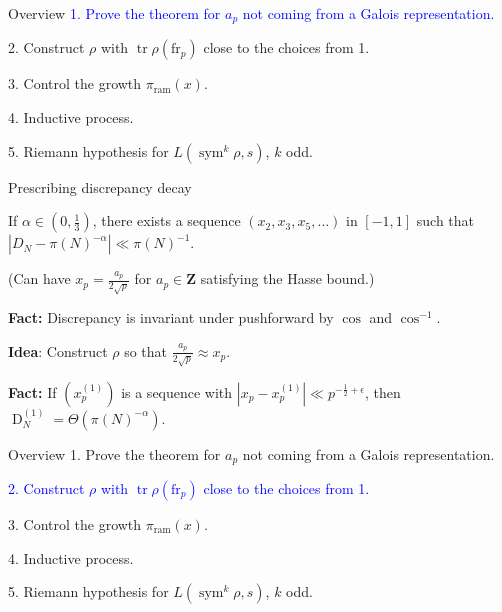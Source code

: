 \documentclass{beamer}
\DeclareMathOperator{\D}{D}
\DeclareMathOperator{\ram}{ram}
\DeclareMathOperator{\sym}{sym}
\DeclareMathOperator{\tr}{tr}
\newcommand{\bZ}{\mathbf{Z}}
\newcommand{\frob}{\mathrm{fr}}
\begin{document}
\begin{frame}{Overview}
\textcolor{blue}{
1. Prove the theorem for $a_p$ not coming from a Galois representation.}

\color{shade}
2. Construct $\rho$ with $\tr\rho(\frob_p)$ close to the choices from 1. 

3. Control the growth $\pi_{\ram}(x)$. 

4. Inductive process.

5. Riemann hypothesis for $L(\sym^k\rho,s)$, $k$ odd.
\end{frame}



\begin{frame}{Prescribing discrepancy decay}
\begin{theorem}[M.]
If $\alpha\in \left(0,\frac 1 3\right)$, there exists a sequence 
$(x_2,x_3,x_5,\dots)$ in $[-1,1]$ such that 
$| D_N - \pi(N)^{-\alpha}| \ll \pi(N)^{-1}$. 
\end{theorem}
\pause

(Can have $x_p = \frac{a_p}{2\sqrt p}$ for $a_p\in \bZ$ satisfying the 
Hasse bound.) 
\pause

\textbf{Fact:} 
Discrepancy is invariant under pushforward by $\cos$ and $\cos^{-1}$. 
\pause

\textbf{Idea}:
Construct $\rho$ so that $\frac{a_p}{2\sqrt p}\approx x_p$. 
\pause

\textbf{Fact:} 
If $(x_p^{(1)})$ is a sequence with $|x_p - x_p^{(1)}| \ll p^{-\frac 1 2+\epsilon}$, 
then $\D_N^{(1)} = \Theta(\pi(N)^{-\alpha})$. 
\end{frame}



\begin{frame}{Overview}
\color{shade}
1. Prove the theorem for $a_p$ not coming from a Galois representation.

\textcolor{blue}{
2. Construct $\rho$ with $\tr\rho(\frob_p)$ close to the choices from 1.}

3. Control the growth $\pi_{\ram}(x)$. 

4. Inductive process.

5. Riemann hypothesis for $L(\sym^k\rho,s)$, $k$ odd.
\end{frame}
\end{document}
